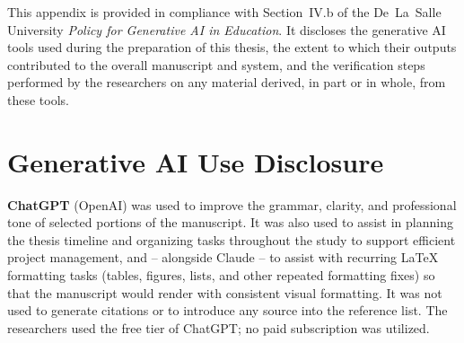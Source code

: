 This appendix is provided in compliance with Section~IV.b of the De~La~Salle University \textit{Policy for Generative AI in Education}. It discloses the generative AI tools used during the preparation of this thesis, the extent to which their outputs contributed to the overall manuscript and system, and the verification steps performed by the researchers on any material derived, in part or in whole, from these tools.

\section*{Generative AI Use Disclosure}

\textbf{ChatGPT} (OpenAI) was used to improve the grammar, clarity, and professional tone of selected portions of the manuscript. It was also used to assist in planning the thesis timeline and organizing tasks throughout the study to support efficient project management, and -- alongside Claude -- to assist with recurring \LaTeX{} formatting tasks (tables, figures, lists, and other repeated formatting fixes) so that the manuscript would render with consistent visual formatting. It was not used to generate citations or to introduce any source into the reference list. The researchers used the free tier of ChatGPT; no paid subscription was utilized.

